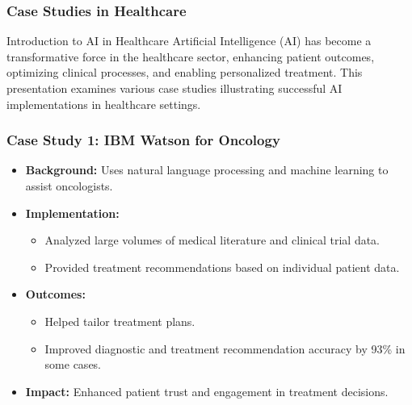 \documentclass[aspectratio=169]{beamer}
\begin{document}
\begin{frame}[fragile]
    \frametitle{Case Studies in Healthcare}
    \begin{block}{Introduction to AI in Healthcare}
        Artificial Intelligence (AI) has become a transformative force in the healthcare sector, enhancing patient outcomes, optimizing clinical processes, and enabling personalized treatment. This presentation examines various case studies illustrating successful AI implementations in healthcare settings.
    \end{block}
\end{frame}

\begin{frame}[fragile]
    \frametitle{Case Study 1: IBM Watson for Oncology}
    \begin{itemize}
        \item \textbf{Background:} Uses natural language processing and machine learning to assist oncologists.
        \item \textbf{Implementation:}
            \begin{itemize}
                \item Analyzed large volumes of medical literature and clinical trial data.
                \item Provided treatment recommendations based on individual patient data.
            \end{itemize}
        \item \textbf{Outcomes:}
            \begin{itemize}
                \item Helped tailor treatment plans.
                \item Improved diagnostic and treatment recommendation accuracy by 93\% in some cases.
            \end{itemize}
        \item \textbf{Impact:} Enhanced patient trust and engagement in treatment decisions.
    \end{itemize}
\end{frame}
\end{document}
